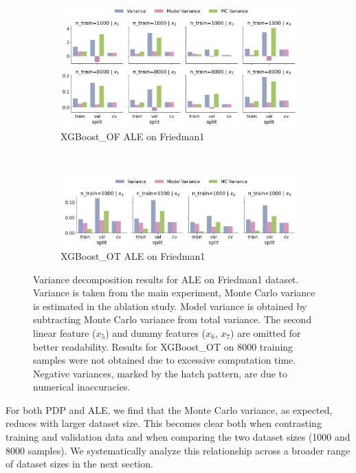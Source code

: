 \documentclass[runningheads]{llncs}
\begin{document}
\begin{figure}[htbp]
    \centering
    \begin{subfigure}[b]{0.75\textwidth}
        \includegraphics[width=\textwidth]{img/variance_decomposition_ale_XGBoost_OF.png}
        \caption{XGBoost\_OF ALE on Friedman1}
    \end{subfigure}
    \\[10pt]
    \vfill
    \begin{subfigure}[b]{0.75\textwidth}
        \includegraphics[width=\textwidth]{img/variance_decomposition_ale_XGBoost_OT.png}
        \caption{XGBoost\_OT ALE on Friedman1}
    \end{subfigure}
    \caption{Variance decomposition results for ALE on Friedman1 dataset. Variance is taken from the
        main experiment, Monte Carlo variance is estimated in the ablation study. Model variance is
        obtained by subtracting Monte Carlo variance from total variance. The second linear feature
        ($x_5$) and dummy features ($x_6$, $x_7$) are omitted for better readability. Results for XGBoost\_OT
        on 8000 training samples were not obtained due to excessive computation time. Negative variances, marked
        by the hatch pattern, are due to numerical inaccuracies.}
    \label{fig:ale-variance-decomp}  %
\end{figure}

\noindent For both PDP and ALE, we find that the Monte Carlo variance, as expected,
reduces with larger dataset size. This becomes clear both when contrasting
training and validation data and when comparing the two dataset sizes (1000 and
8000 samples). We systematically analyze this relationship across a broader range
of dataset sizes in the next section.
\end{document}
